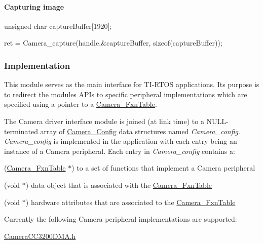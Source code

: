 \paragraph*{Capturing image}


\begin{DoxyCode}
\textcolor{keywordtype}{unsigned} \textcolor{keywordtype}{char} captureBuffer[1920];

ret = Camera_capture(handle,&captureBuffer, \textcolor{keyword}{sizeof}(captureBuffer));
\end{DoxyCode}


\subsubsection*{Implementation}

This module serves as the main interface for T\+I-\/\+R\+T\+O\+S applications. Its purpose is to redirect the module\textquotesingle{}s A\+P\+Is to specific peripheral implementations which are specified using a pointer to a \hyperlink{struct_camera___fxn_table}{Camera\+\_\+\+Fxn\+Table}.

The Camera driver interface module is joined (at link time) to a N\+U\+L\+L-\/terminated array of \hyperlink{struct_camera___config}{Camera\+\_\+\+Config} data structures named {\itshape Camera\+\_\+config}. {\itshape Camera\+\_\+config} is implemented in the application with each entry being an instance of a Camera peripheral. Each entry in {\itshape Camera\+\_\+config} contains a\+:
\begin{DoxyItemize}
\item (\hyperlink{struct_camera___fxn_table}{Camera\+\_\+\+Fxn\+Table} $\ast$) to a set of functions that implement a Camera peripheral
\item (void $\ast$) data object that is associated with the \hyperlink{struct_camera___fxn_table}{Camera\+\_\+\+Fxn\+Table}
\item (void $\ast$) hardware attributes that are associated to the \hyperlink{struct_camera___fxn_table}{Camera\+\_\+\+Fxn\+Table}
\end{DoxyItemize}

Currently the following Camera peripheral implementations are supported\+:
\begin{DoxyItemize}
\item \hyperlink{_camera_c_c3200_d_m_a_8h}{Camera\+C\+C3200\+D\+M\+A.\+h}
\end{DoxyItemize}



